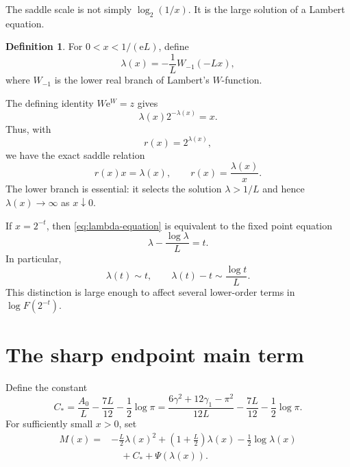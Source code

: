 \documentclass[11pt]{article}
\numberwithin{equation}{section}
\theoremstyle{definition}
\newtheorem{definition}[theorem]{Definition}
\theoremstyle{remark}
\newcommand{\e}{\mathrm{e}}
\begin{document}
The saddle scale is not simply $\log_2(1/x)$.  It is the large solution of a
Lambert equation.

\begin{definition}\label{def:lambda}
For $0<x<1/(\e L)$, define
\begin{equation}\label{eq:lambda-W}
 \lambda(x)=-\frac1L W_{-1}(-Lx),
\end{equation}
where $W_{-1}$ is the lower real branch of Lambert's $W$-function.
\end{definition}

The defining identity $W\e^W=z$ gives
\begin{equation}\label{eq:lambda-equation}
 \lambda(x)2^{-\lambda(x)}=x.
\end{equation}
Thus, with
\begin{equation}\label{eq:radius}
 r(x)=2^{\lambda(x)},
\end{equation}
we have the exact saddle relation
\begin{equation}\label{eq:rx-lambda}
 r(x)x=\lambda(x),
 \qquad
 r(x)=\frac{\lambda(x)}x.
\end{equation}
The lower branch is essential: it selects the solution
$\lambda>1/L$ and hence $\lambda(x)\to\infty$ as $x\downarrow0$.

If $x=2^{-t}$, then \eqref{eq:lambda-equation} is equivalent to the fixed
point equation
\begin{equation}\label{eq:lambda-fixed-point}
 \lambda-\frac{\log\lambda}{L}=t.
\end{equation}
In particular,
\begin{equation}\label{eq:lambda-sim-t}
 \lambda(t)\sim t,
 \qquad
 \lambda(t)-t\sim\frac{\log t}{L}.
\end{equation}
This distinction is large enough to affect several lower-order terms in
$\log F(2^{-t})$.

\section{The sharp endpoint main term}\label{sec:sharp-main}

Define the constant
\begin{equation}\label{eq:Csharp}
 C_*=\frac{A_0}{L}-\frac{7L}{12}-\frac12\log\pi
 =\frac{6\gamma^2+12\gamma_1-\pi^2}{12L}
  -\frac{7L}{12}-\frac12\log\pi.
\end{equation}
For sufficiently small $x>0$, set
\begin{equation}\label{eq:Msharp}
 \begin{split}
 M(x)={}&-\frac L2\lambda(x)^2
 +\left(1+\frac L2\right)\lambda(x)
 -\frac12\log\lambda(x)\\
 &\quad+C_*+\Psi(\lambda(x)).
 \end{split}
\end{equation}
\end{document}
